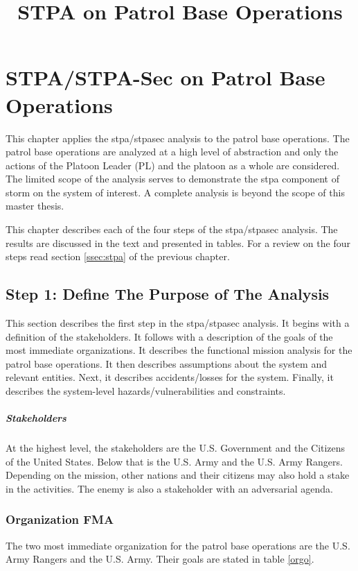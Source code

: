 \documentclass[../../main/main.tex]{subfiles}
\begin{document}
\title{STPA on Patrol Base Operations}

\chapter{STPA/STPA-Sec on Patrol Base Operations}\label{chp:stpapb}
This chapter applies the \gls{stpa}/\gls{stpasec} analysis to the patrol base operations.  The patrol base operations are analyzed at a high level of abstraction and only the actions of the Platoon Leader (PL) and the platoon as a whole are considered.  The limited scope of the analysis serves to demonstrate the \gls{stpa} component of \gls{storm} on the system of interest.  A complete analysis is beyond the scope of this master thesis. 

This chapter describes each of the four steps of the \gls{stpa}/\gls{stpasec} analysis.  The results are discussed in the text and presented in tables.   For a review on the four steps read section \ref{ssec:stpa} of the previous chapter.

\section{Step 1: Define The Purpose of The Analysis}\label{chp:stpapb:purpose}
This section describes the first step in the \gls{stpa}/\gls{stpasec} analysis.  It begins with a definition of the stakeholders.  It follows with a description of the goals of the most immediate organizations.  It describes the functional mission analysis for the patrol base operations.  It then describes assumptions about the system and relevant entities.  Next, it describes accidents/losses for the system.  Finally, it describes the system-level hazards/vulnerabilities and constraints.

\paragraph*{Stakeholders}
At the highest level, the stakeholders are the U.S. Government and the Citizens of the United States.  Below that is the U.S. Army and the U.S. Army Rangers.  Depending on the mission, other nations and their citizens may also hold a stake in the activities.  The enemy is also a stakeholder with an adversarial agenda. 

\subsection{Organization FMA}
The two most immediate organization for the patrol base operations are the U.S. Army Rangers and the U.S. Army.  Their goals are stated in table \ref{orgo}.
\end{document}
